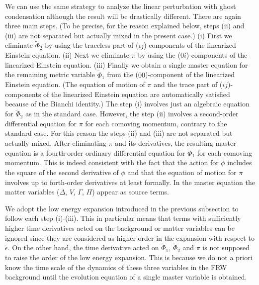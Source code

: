 We can use the same strategy to analyze the linear perturbation with
ghost condensation although the result will be drastically
different. There are again three main steps. (To be precise, 
for the reason explained below, steps (ii) and (iii) are not separated
but actually mixed in the present case.) (i) First we eliminate
$\tilde{\Phi}_2$ by using the traceless part of ($ij$)-components of the
linearized Einstein equation. (ii) Next we eliminate $\pi$ by using the
($0i$)-components of the linearized Einstein equation. (iii) Finally we 
obtain a single master equation for the remaining metric variable
$\tilde{\Phi}_1$ from the ($00$)-component of the linearized Einstein
equation. (The equation of motion of $\pi$ and the trace part of
($ij$)-components of the linearized Einstein equation are automatically 
satisfied because of the Bianchi identity.) The step (i) involves just
an algebraic equation for $\tilde{\Phi}_2$ as in the standard
case. However, the step (ii) involves a second-order differential
equation for $\pi$ for each comoving momentum, contrary to the standard
case. For this reason the steps (ii) and (iii) are not separated but
actually mixed. After eliminating $\pi$ and its derivatives, the
resulting master equation is a fourth-order ordinary differential
equation for $\tilde{\Phi}_1$ for each comoving momentum. This is indeed
consistent with the fact that the action for $\phi$ includes the square
of the second derivative of $\phi$ and that the equation of motion for
$\pi$ involves up to forth-order derivatives at least formally. In the
master equation the matter variables ($\Delta$, $V$, $\Gamma$, $\Pi$)
appear as source terms. 



We adopt the low energy expansion introduced in the previous subsection
to follow each step (i)-(iii). This in particular means that terms with
sufficiently higher time derivatives acted on the background or matter
variables can be ignored since they are considered as higher order in
the expansion with respect to $\tilde{\epsilon}$. On the other hand, the
time derivative acted on $\tilde{\Phi}_1$, $\tilde{\Phi}_2$ and $\pi$ is
not supposed to raise the order of the low energy expansion. This is
because we do not a priori know the time scale of the dynamics of these
three variables in the FRW background until the evolution equation of a
single master variable is obtained. 



